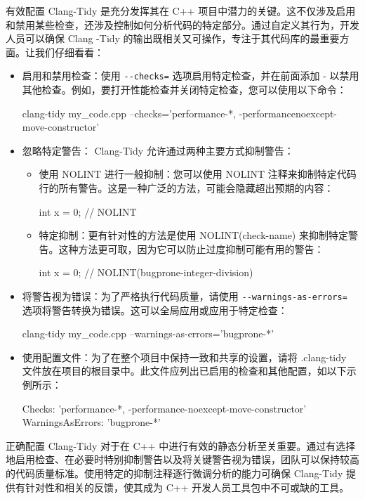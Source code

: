 
有效配置 Clang-Tidy 是充分发挥其在 C++ 项目中潜力的关键。这不仅涉及启用和禁用某些检查，还涉及控制如何分析代码的特定部分。通过自定义其行为，开发人员可以确保 Clang -Tidy 的输出既相关又可操作，专注于其代码库的最重要方面。让我们仔细看看：

\begin{itemize}
\item
启用和禁用检查：使用 \verb|--checks=| 选项启用特定检查，并在前面添加 - 以禁用其他检查。例如，要打开性能检查并关闭特定检查，您可以使用以下命令：

\begin{shell}
clang-tidy my_code.cpp --checks='performance-*, -performancenoexcept-move-constructor'
\end{shell}

\item
忽略特定警告： Clang-Tidy 允许通过两种主要方式抑制警告：

\begin{itemize}
\item
使用 NOLINT 进行一般抑制：您可以使用 NOLINT 注释来抑制特定代码行的所有警告。这是一种广泛的方法，可能会隐藏超出预期的内容：

\begin{cpp}
int x = 0; // NOLINT
\end{cpp}

\item
特定抑制：更有针对性的方法是使用 NOLINT(check-name) 来抑制特定警告。这种方法更可取，因为它可以防止过度抑制可能有用的警告：

\begin{cpp}
int x = 0; // NOLINT(bugprone-integer-division)
\end{cpp}

\end{itemize}

\item
将警告视为错误：为了严格执行代码质量，请使用 \verb|--warnings-as-errors=| 选项将警告转换为错误。这可以全局应用或应用于特定检查：

\begin{shell}
clang-tidy my_code.cpp --warnings-as-errors='bugprone-*'
\end{shell}

\item
使用配置文件：为了在整个项目中保持一致和共享的设置，请将 .clang-tidy 文件放在项目的根目录中。此文件应列出已启用的检查和其他配置，如以下示例所示：

\begin{shell}
Checks: 'performance-*, -performance-noexcept-move-constructor' WarningsAsErrors: 'bugprone-*'
\end{shell}
\end{itemize}

正确配置 Clang-Tidy 对于在 C++ 中进行有效的静态分析至关重要。通过有选择地启用检查、在必要时特别抑制警告以及将关键警告视为错误，团队可以保持较高的代码质量标准。使用特定的抑制注释逐行微调分析的能力可确保 Clang-Tidy 提供有针对性和相关的反馈，使其成为 C++ 开发人员工具包中不可或缺的工具。














